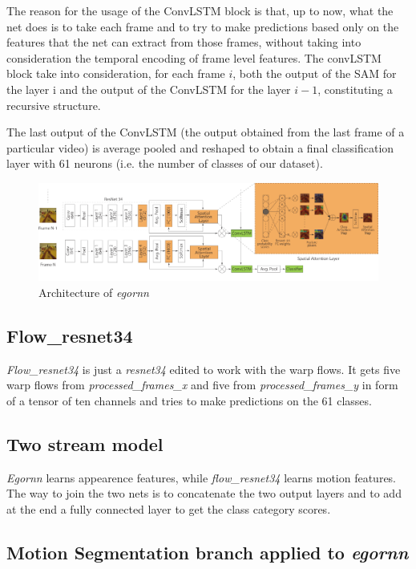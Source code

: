 \documentclass[10pt,twocolumn,hidelinks,letterpaper]{article}
\begin{document}
The reason for the usage of the ConvLSTM block is that, up to now, what the net does is to take each frame and to try to make predictions based only on the features that the net can extract from those frames, without taking into consideration the temporal encoding of frame level features. The convLSTM block take into consideration, for each frame $i$, both the output of the SAM for the layer i and the output of the ConvLSTM for the layer $i-1$, constituting a recursive structure.

The last output of the ConvLSTM (the output obtained from the last frame of a particular video) is average pooled and reshaped to obtain a final classification layer with 61 neurons (i.e. the number of classes of our dataset).

\begin{figure}
	\centering
	\includegraphics[width=\linewidth]{images/egornn.png}
	\caption{Architecture of \textit{egornn}}
	\label{egornn_arch}
\end{figure}

\subsection{Flow\_resnet34}

\textit{Flow\_resnet34} is just a \textit{resnet34} edited to work with the warp flows. It gets five warp flows from \textit{processed\_frames\_x} and five from \textit{processed\_frames\_y} in form of a tensor of ten channels and tries to make predictions on the 61 classes.

\subsection{Two stream model}

\textit{Egornn} learns appearence features, while \textit{flow\_resnet34} learns motion features. The way to join the two nets is to concatenate the two output layers and to add at the end a fully connected layer to get the class category scores.

\subsection{Motion Segmentation branch applied to \textit{egornn}}
\end{document}
